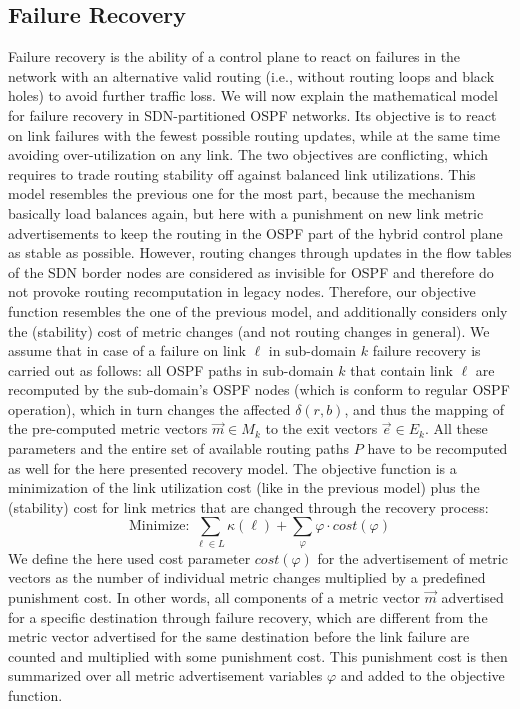 \documentclass[journal]{IEEEtran}
\begin{document}
\subsection{Failure Recovery}\label{math_fr}
Failure recovery is the ability of a control plane to react on failures in the network with an alternative valid routing (i.e., without routing loops and black holes) to avoid further traffic loss. We will now explain the mathematical model for failure recovery in SDN-partitioned OSPF networks. Its objective is to react on link failures with the fewest possible routing updates, while at the same time avoiding over-utilization on any link. The two objectives are conflicting, which requires to trade routing stability off against balanced link utilizations. This model resembles the previous one for the most part, because the mechanism basically load balances again, but here with a punishment on new link metric advertisements to keep the routing in the OSPF part of the hybrid control plane as stable as possible. However, routing changes through updates in the flow tables of the SDN border nodes are considered as invisible for OSPF and therefore do not provoke routing recomputation in legacy nodes. Therefore, our objective function resembles the one of the previous model, and additionally considers only the (stability) cost of metric changes (and not routing changes in general). We assume that in case of a failure on link $\ell$ in sub-domain $k$ failure recovery is carried out as follows: all OSPF paths in sub-domain $k$ that contain link $\ell$ are recomputed by the sub-domain's OSPF nodes (which is conform to regular OSPF operation), which in turn changes the affected $\delta(r,b)$, and thus the mapping of the pre-computed metric vectors $\vec{m}\in M_k$ to the exit vectors $\vec{e}\in E_k$. All these parameters and the entire set of available routing paths $P$ have to be recomputed as well for the here presented recovery model. The objective function is a minimization of the link utilization cost (like in the previous model) plus the (stability) cost for link metrics that are changed through the recovery process:
\begin{equation*}
\text{Minimize:}\,\, \sum_{\ell\in L} \kappa(\ell) + \sum_{\varphi} \varphi \cdot cost(\varphi)
\end{equation*}
We define the here used cost parameter $cost(\varphi)$ for the advertisement of metric vectors as the number of individual metric changes multiplied by a predefined punishment cost. In other words, all components of a metric vector $\vec{m}$ advertised for a specific destination through failure recovery, which are different from the metric vector advertised for the same destination before the link failure are counted and multiplied with some punishment cost. This punishment cost is then summarized over all metric advertisement variables $\varphi$ and added to the objective function.
\end{document}
